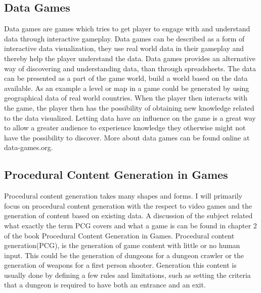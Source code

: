 \documentclass[a4paper,11pt]{article}
\begin{document}
\subsection{Data Games}
\label{datagames}
Data games are games which tries to get player to engage with and understand data through interactive gameplay. Data games can be described as a form of interactive data visualization, they use real world data in their gameplay and thereby help the player understand the data. Data games provides an alternative way of discovering and understanding data, than through spreadsheets. The data can be presented as a part of the game world, build a world based on the data available. As an example a level or map in a game could be generated by using geographical data of real world countries. When the player then interacts with the game, the player then has the possibility of obtaining new knowledge related to the data visualized.  Letting data have an influence on the game is a great way to allow a greater audience to experience knowledge they otherwise might not have the possibility to discover. More about data games can be found online at data-games.org\cite{datagames}.

\subsection{Procedural Content Generation in Games}
\label{procgen}
Procedural content generation takes many shapes and forms. I will primarily focus on procedural content generation with the respect to video games and the generation of content based on existing data. A discussion of the subject related what exactly the term PCG covers and what a game is can be found in chapter 2 of the book Procedural Content Generation in Games\cite[p. 1]{shaker2014procedural}.
Procedural content generation(PCG), is the generation of game content with little or no human input. This could be the generation of dungeons for a dungeon crawler or the generation of weapons for a first person shooter. Generation this content is usually done by defining a few rules and limitations, such as setting the criteria that a dungeon is required to have both an entrance and an exit. 
\end{document}
